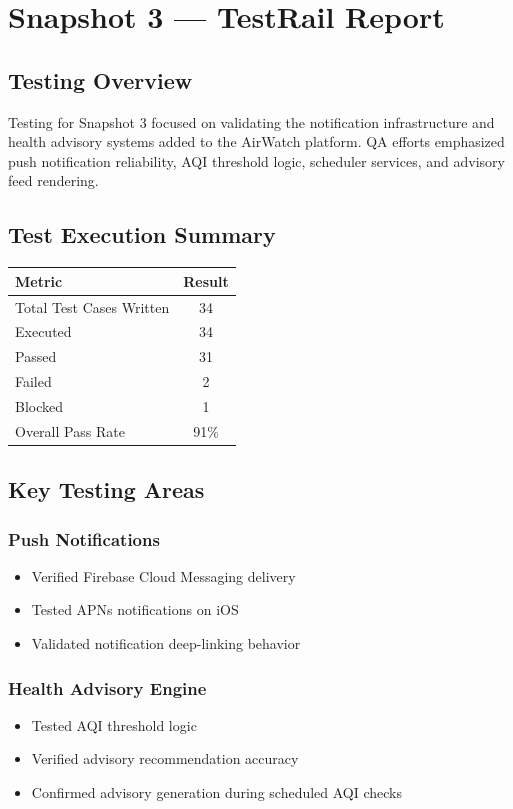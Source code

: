 \section{Snapshot 3 --- TestRail Report}

\subsection{Testing Overview}

Testing for Snapshot 3 focused on validating the notification infrastructure and health advisory systems added to the AirWatch platform. QA efforts emphasized push notification reliability, AQI threshold logic, scheduler services, and advisory feed rendering.

\subsection{Test Execution Summary}

\begin{table}[h]
\centering
\begin{tabular}{|l|c|}
\hline
\textbf{Metric} & \textbf{Result} \\
\hline
Total Test Cases Written & 34 \\
Executed & 34 \\
Passed & 31 \\
Failed & 2 \\
Blocked & 1 \\
Overall Pass Rate & 91\% \\
\hline
\end{tabular}
\end{table}

\subsection{Key Testing Areas}

\subsubsection{Push Notifications}
\begin{itemize}
    \item Verified Firebase Cloud Messaging delivery
    \item Tested APNs notifications on iOS
    \item Validated notification deep-linking behavior
\end{itemize}

\subsubsection{Health Advisory Engine}
\begin{itemize}
    \item Tested AQI threshold logic
    \item Verified advisory recommendation accuracy
    \item Confirmed advisory generation during scheduled AQI checks
\end{itemize}

